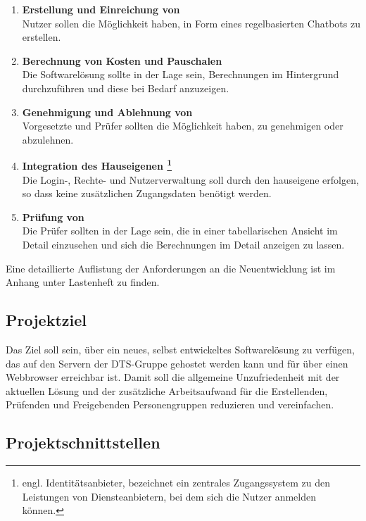 \begin{enumerate}
    \item \textbf{Erstellung und Einreichung von }\\
    Nutzer sollen die Möglichkeit haben,  in Form eines regelbasierten Chatbots zu erstellen.
    \item \textbf{Berechnung von Kosten und Pauschalen}\\
    Die Softwarelösung sollte in der Lage sein, Berechnungen im Hintergrund durchzuführen und diese bei Bedarf anzuzeigen.
    \item \textbf{Genehmigung und Ablehnung von }\\
    Vorgesetzte und Prüfer sollten die Möglichkeit haben,  zu genehmigen oder abzulehnen.
    \item \textbf{Integration des Hauseigenen  \footnote{engl. Identitätsanbieter, bezeichnet ein zentrales Zugangssystem zu den Leistungen von Diensteanbietern, bei dem sich die Nutzer anmelden können.}}\\
    Die Login-, Rechte- und Nutzerverwaltung soll durch den hauseigene  erfolgen, so dass keine zusätzlichen Zugangsdaten benötigt werden.
    \item \textbf{Prüfung von }\\
    Die Prüfer sollten in der Lage sein, die  in einer tabellarischen Ansicht im Detail einzusehen und sich die Berechnungen im Detail anzeigen zu lassen.
\end{enumerate}

Eine detaillierte Auflistung der Anforderungen an die Neuentwicklung ist im Anhang unter Lastenheft zu finden.\todo

\subsection{Projektziel}
\label{sec:Einführung-Definitionsphase:Projektziel}

Das Ziel soll sein, über ein neues, selbst entwickeltes Softwarelösung zu verfügen, das auf den Servern der DTS-Gruppe gehostet werden kann und für  über einen Webbrowser erreichbar ist. Damit soll die allgemeine Unzufriedenheit mit der aktuellen Lösung und der zusätzliche Arbeitsaufwand für die Erstellenden, Prüfenden und Freigebenden Personengruppen reduzieren und vereinfachen.

\subsection{Projektschnittstellen}
\label{sec:Einführung-Definitionsphase:Projektschnittstellen}

